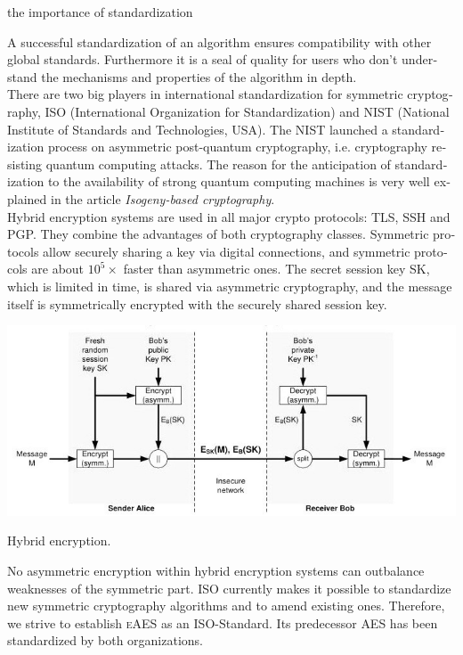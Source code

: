 \documentclass[a4paper,11pt]{article}
\begin{document}
\begin{otherlanguage}{english}
\begin{multicols}{2}
 {the importance of standardization}
\vspace{0.1cm}

\noindent
A successful standardization of an algorithm ensures compatibility with other global standards. Furthermore it is a seal of quality for users who don't understand the mechanisms and properties of the algorithm in depth. \\ 

\noindent
There are two big players in international standardization for symmetric cryptography, ISO (International Organization for Standardization) and NIST (National Institute of Standards and Technologies, USA). The NIST launched a standardization process on asymmetric post-quantum cryptography, i.e. cryptography resisting quantum computing attacks. The reason for the anticipation of standardization to the availability of strong quantum computing machines is very well explained in the article \textit{Isogeny-based cryptography}.\\

\noindent
Hybrid encryption systems are used in all major crypto protocols: TLS, SSH and PGP. They combine the advantages of both cryptography classes. Symmetric protocols allow securely sharing a key via digital connections, and symmetric protocols are about $10^5 \times$ faster than asymmetric ones. The secret session key SK, which is limited in time, is shared via asymmetric cryptography, and the message itself is symmetrically encrypted with the securely shared session key.\\

\begin{figurehere}
  \centering
  \includegraphics[width=\columnwidth]{hybrid-encryption.jpg}
  \caption{Hybrid encryption.\label{abb_1}}
\end{figurehere}

\vspace{0.3cm}
\noindent
No asymmetric encryption within hybrid encryption systems can outbalance weaknesses of the symmetric part. ISO currently makes it possible to standardize new symmetric cryptography algorithms and to amend existing ones. Therefore, we strive to establish \textsc{eAES} as an ISO-Standard. Its predecessor \textsc{AES} has been standardized by both organizations. \\ \\ 


\end{multicols}
\end{otherlanguage}
\end{document}

